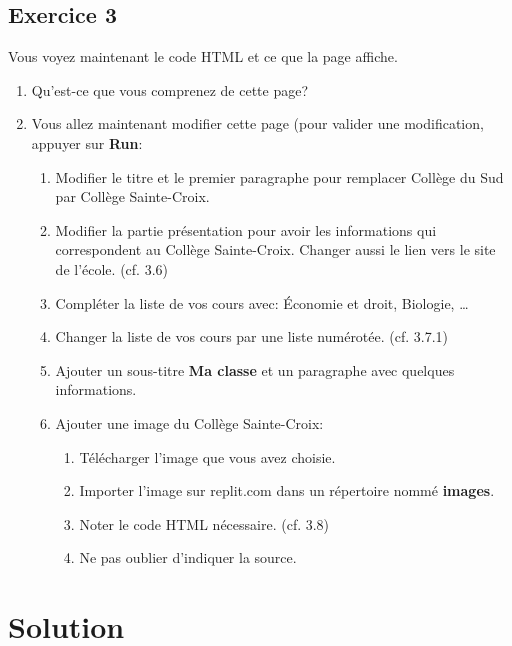 \documentclass[a4paper,11pt]{article}
\begin{document}
\subsection{Exercice 3}
Vous voyez maintenant le code HTML et ce que la page affiche.
\begin{enumerate}[label=\arabic*)]
\item Qu'est-ce que vous comprenez de cette page?
\item Vous allez maintenant modifier cette page (pour valider une modification, appuyer sur \textbf{Run}:
\begin{enumerate}
  \item Modifier le titre et le premier paragraphe pour remplacer Collège du Sud par Collège Sainte-Croix.
  \item Modifier la partie présentation pour avoir les informations qui correspondent au Collège Sainte-Croix. Changer aussi le lien vers le site de l'école. (cf. 3.6)
  \item Compléter la liste de vos cours avec: Économie et droit, Biologie, \dots
  \item Changer la liste de vos cours par une liste numérotée. (cf. 3.7.1)
  \item Ajouter un sous-titre \textbf{Ma classe} et un paragraphe avec quelques informations.
  \item Ajouter une image du Collège Sainte-Croix:
\begin{enumerate}[label=\roman*.]
    \item Télécharger l'image que vous avez choisie.
    \item Importer l'image sur replit.com dans un répertoire nommé \textbf{images}.
    \item Noter le code HTML nécessaire. (cf. 3.8)
  \item Ne pas oublier d'indiquer la source.
\end{enumerate}
\end{enumerate}
\end{enumerate}

\section{Solution}
\end{document}
